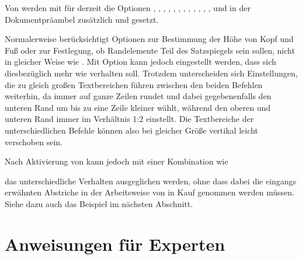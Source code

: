 {\setlength{\emergencystretch}{1em}%
Von  werden mit  für 
derzeit die Optionen
, , ,
, , ,
, , ,
, , , 
und in der Dokumentpräambel zusätzlich  und
 gesetzt.\par}%
\EndIndexGroup


\begin{Declaration}
\end{Declaration}
Normalerweise berücksichtigt  Optionen zur
Bestimmung der Höhe von Kopf und Fuß oder zur Festlegung, ob Randelemente Teil
des Satzspiegels sein sollen, nicht in gleicher Weise wie
. Mit Option
 kann jedoch
eingestellt werden, dass sich  diesbezüglich
mehr wie  verhalten soll. Trotzdem
unterscheiden sich Einstellungen, die zu gleich großen Textbereichen führen
zwischen den beiden Befehlen weiterhin, da 
immer auf ganze Zeilen rundet und dabei gegebenenfalls den unteren Rand um bis
zu eine Zeile kleiner wählt, während  den oberen
und unteren Rand immer im Verhältnis 1:2 einstellt.  Die Textbereiche der
unterschiedlichen Befehle können also bei gleicher Größe vertikal leicht
verschoben sein.

Nach Aktivierung von  kann jedoch mit einer
Kombination wie
\begin{lstcode}[escapeinside=><]
  \areaset[current]{\textwidth}{\textheight}
\end{lstcode}
das unterschiedliche Verhalten ausgeglichen werden, ohne dass dabei die
eingangs erwähnten Abstriche in der Arbeitsweise von  in Kauf
genommen werden müssen. Siehe dazu auch das Beispiel im nächsten Abschnitt.%
\EndIndexGroup


\section{Anweisungen für Experten}


